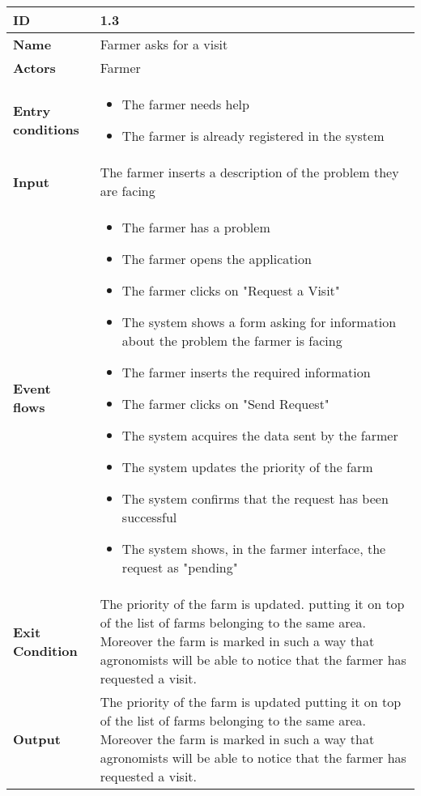 \begin{longtable}[H]{ | l | p{10cm} | }
\hline
{\cellcolor[rgb]{0.753,0.753,0.753}}\textbf{ID}  & 1.3 \\ \hline
{\cellcolor[rgb]{0.753,0.753,0.753}}\textbf{Name} & Farmer asks for a visit \\ \hline
{\cellcolor[rgb]{0.753,0.753,0.753}}\textbf{Actors} & Farmer \\ \hline
{\cellcolor[rgb]{0.753,0.753,0.753}}\textbf{Entry conditions} &
\begin{itemize}
    \item The farmer needs help
    \item The farmer is already registered in the system
\end{itemize}
\\ \hline
{\cellcolor[rgb]{0.753,0.753,0.753}}\textbf{Input} & The farmer inserts a description of the problem they are facing\\ \hline
{\cellcolor[rgb]{0.753,0.753,0.753}}\textbf{Event flows} &
\begin{itemize}
    \item The farmer has a problem
    \item The farmer opens the application
    \item The farmer clicks on "Request a Visit"
    \item The system shows a form asking for information about the problem the farmer is facing
    \item The farmer inserts the required information
    \item The farmer clicks on "Send Request"
    \item The system acquires the data sent by the farmer
    \item The system updates the priority of the farm
    \item The system confirms that the request has been successful
    \item The system shows, in the farmer interface, the request as "pending"
\end{itemize}
\\ \hline
{\cellcolor[rgb]{0.753,0.753,0.753}}\textbf{Exit Condition} & The priority of the farm is updated. putting it on top of the list of farms belonging to the same area. Moreover the farm is marked in such a way that agronomists will be able to notice that the farmer has requested a visit.\\ \hline
{\cellcolor[rgb]{0.753,0.753,0.753}}\textbf{Output} & 
The priority of the farm is updated putting it on top of the list of farms belonging to the same area. Moreover the farm is marked in such a way that agronomists will be able to notice that the farmer has requested a visit.

\end{longtable}
